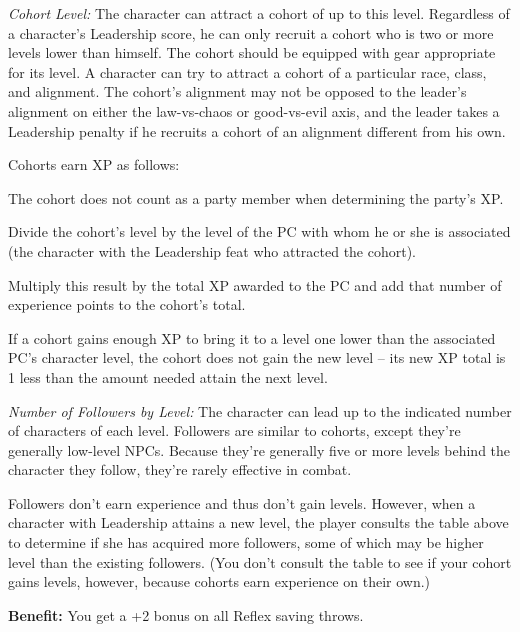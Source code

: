 \textit{Cohort Level:} The character can attract a cohort of up to this level. 
Regardless of a character's Leadership score, he can only recruit a cohort who 
is two or more levels lower than himself. The cohort should be equipped with gear 
appropriate for its level. A character can try to attract a cohort of a particular 
race, class, and alignment. The cohort's alignment may not be opposed to the leader's 
alignment on either the law-vs-chaos or good-vs-evil axis, and the leader takes 
a Leadership penalty if he recruits a cohort of an alignment different from his 
own.

Cohorts earn XP as follows:

\begin{itemize*}
\item The cohort does not count as a party member when determining the party's XP.
\item Divide the cohort's level by the level of the PC with whom he or she is associated 
(the character with the Leadership feat who attracted the cohort).
\item Multiply this result by the total XP awarded to the PC and add that number of experience 
points to the cohort's total.
\item If a cohort gains enough XP to bring it to a level one lower than the associated 
PC's character level, the cohort does not gain the new level -- its new XP total 
is 1 less than the amount needed attain the next level. 
\end{itemize*}

\textit{Number of Followers by Level:} The character can lead up to the indicated 
number of characters of each level. Followers are similar to cohorts, except they're 
generally low-level NPCs. Because they're generally five or more levels behind 
the character they follow, they're rarely effective in combat.

Followers don't earn experience and thus don't gain levels. However, when a character 
with Leadership attains a new level, the player consults the table above to determine 
if she has acquired more followers, some of which may be higher level than the 
existing followers. (You don't consult the table to see if your cohort gains levels, 
however, because cohorts earn experience on their own.)


\textbf{Benefit:} You get a +2 bonus on all Reflex saving throws.


